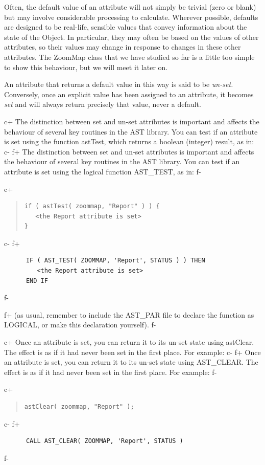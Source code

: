 \documentclass[twoside,11pt]{article}
\begin{document}
Often, the default value of an attribute will not simply be trivial
(zero or blank) but may involve considerable processing to
calculate. Wherever possible, defaults are designed to be real-life,
sensible values that convey information about the state of the
Object. In particular, they may often be based on the values of other
attributes, so their values may change in response to changes in these
other attributes. The ZoomMap class that we have studied so far is a
little too simple to show this behaviour, but we will meet it later
on.

An attribute that returns a default value in this way is said to be
{\em{un-set.}} Conversely, once an explicit value has been assigned to
an attribute, it becomes {\em{set}} and will always return precisely
that value, never a default.

c+
The distinction between set and un-set attributes is important and
affects the behaviour of several key routines in the AST library. You
can test if an attribute is set using the function astTest, which
returns a boolean (integer) result, as in:
c-
f+
The distinction between set and un-set attributes is important and
affects the behaviour of several key routines in the AST library. You
can test if an attribute is set using the logical function AST\_TEST,
as in:
f-

c+
\begin{quote}
\small
\begin{verbatim}
if ( astTest( zoommap, "Report" ) ) {
   <the Report attribute is set>
}
\end{verbatim}
\normalsize
\end{quote}
c-
f+
\small
\begin{verbatim}
      IF ( AST_TEST( ZOOMMAP, 'Report', STATUS ) ) THEN
         <the Report attribute is set>
      END IF
\end{verbatim}
\normalsize
f-

f+
(as usual, remember to include the AST\_PAR file to declare the
function as LOGICAL, or make this declaration yourself).
f-

c+
Once an attribute is set, you can return it to its un-set state using
astClear. The effect is as if it had never been set in the first
place. For example:
c-
f+
Once an attribute is set, you can return it to its un-set state using
AST\_CLEAR. The effect is as if it had never been set in the first
place. For example:
f-

c+
\begin{quote}
\small
\begin{verbatim}
astClear( zoommap, "Report" );
\end{verbatim}
\normalsize
\end{quote}
c-
f+
\small
\begin{verbatim}
      CALL AST_CLEAR( ZOOMMAP, 'Report', STATUS )
\end{verbatim}
\normalsize
f-
\end{document}
